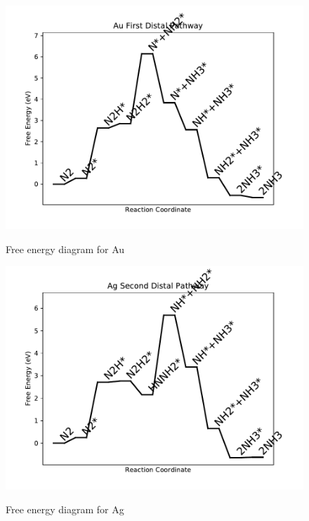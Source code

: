 \documentclass{article}
\begin{document}
\newpage
\begin{figure}
\includegraphics[width=1\linewidth]{data/plots/Au_distal_1.pdf}
\label{fig:Au_distal_1}
\caption{Free energy diagram for Au}
\end{figure}

\begin{figure}
\includegraphics[width=1\linewidth]{data/plots/Ag_distal_2.pdf}
\label{fig:Ag_distal_2}
\caption{Free energy diagram for Ag}
\end{figure}
\end{document}
